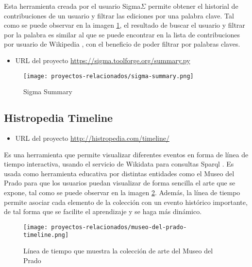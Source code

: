 Esta herramienta creada por el usuario Sigma\(\Sigma\) permite obtener el historial de contribuciones de un usuario y filtrar las ediciones por una palabra clave. Tal como se puede observar en la imagen \ref{fig:sigma_summary}, el resultado de buscar el usuario  y filtrar por la palabra  es similar al que se puede encontrar en la lista de contribuciones por usuario de Wikipedia \cite{UserClarityfiend}, con el beneficio de poder filtrar por palabras claves.

\begin{itemize}
    \item URL del proyecto \url{https://sigma.toolforge.org/summary.py}
\end{itemize}

\begin{figure}[H]
    \centering
    \texttt{[image: proyectos-relacionados/sigma-summary.png]}
    \caption{Sigma Summary}
    \label{fig:sigma_summary}
\end{figure}

\subsection{Histropedia Timeline}

\begin{itemize}
    \item URL del proyecto \url{http://histropedia.com/timeline/}
\end{itemize}

Es una herramienta que permite visualizar diferentes eventos en forma de línea de tiempo interactiva, usando el servicio de Wikidata para consultas Sparql \cite{WikidataSparql}. Es usada como herramienta educativa por distintas entidades como el Museo del Prado para que los usuarios puedan visualizar de forma sencilla el arte que se expone, tal como se puede observar en la imagen \ref{fig:museo-de-prado-timeline}. Además, la línea de tiempo permite asociar cada elemento de la colección con un evento histórico importante, de tal forma que se facilite el aprendizaje y se haga más dinámico.

\begin{figure}[H]
    \centering
    \texttt{[image: proyectos-relacionados/museo-del-prado-timeline.png]}
    \caption{Línea de tiempo que muestra la colección de arte del Museo del Prado}
    \label{fig:museo-de-prado-timeline}
\end{figure}



